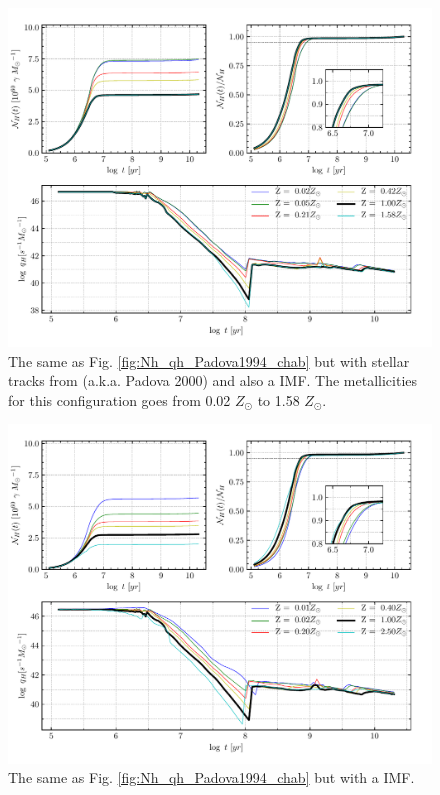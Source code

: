\documentclass[12pt,letterpaper,usenatbib,useAMS]{article}
\begin{document}
\begin{figure}
    \includegraphics[width=\textwidth]{Nh_logt_metBase_Padova2000_chab.pdf}
    \caption{The same as Fig. \ref{fig:Nh_qh_Padova1994_chab} but with stellar tracks from \citep{Girardi.etal.2000a} (a.k.a. Padova 2000) and also a \citet{Chabrier.2003a} IMF. The metallicities for this configuration goes from 0.02 $Z_\odot$ to 1.58 $Z_\odot$.}
    \label{fig:Nh_qh_Padova2000_chab}
\end{figure}

\begin{figure}
    \includegraphics[width=\textwidth]{Nh_logt_metBase_Padova1994_salp.pdf}
    \caption{The same as Fig. \ref{fig:Nh_qh_Padova1994_chab} but with a \citet{Salpeter.1955a} IMF.}
    \label{fig:Nh_qh_Padova1994_salp}
\end{figure}
\end{document}
